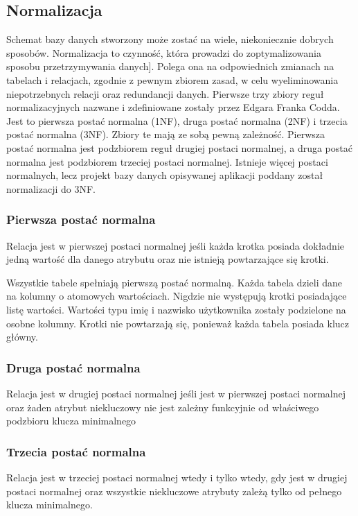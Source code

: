 \subsection{Normalizacja}
Schemat bazy danych stworzony może zostać na wiele, niekoniecznie dobrych sposobów. Normalizacja to czynność, która prowadzi do zoptymalizowania sposobu przetrzymywania danych]. Polega ona na odpowiednich zmianach na tabelach i relacjach, zgodnie z pewnym zbiorem zasad, w celu wyeliminowania niepotrzebnych relacji oraz redundancji danych. Pierwsze trzy zbiory reguł normalizacyjnych nazwane i zdefiniowane zostały przez Edgara Franka Codda. Jest to pierwsza postać normalna (1NF), druga postać normalna (2NF) i trzecia postać normalna (3NF). Zbiory te mają ze sobą pewną zależność. Pierwsza postać normalna jest podzbiorem reguł drugiej postaci normalnej, a druga postać normalna jest podzbiorem trzeciej postaci normalnej. Istnieje więcej postaci normalnych, lecz projekt bazy danych opisywanej aplikacji poddany został normalizacji do 3NF. \cite{db}

\subsubsection{Pierwsza postać normalna}
	\begin{definition}
 		Relacja jest w pierwszej postaci normalnej jeśli każda krotka posiada dokładnie jedną wartość dla danego atrybutu oraz nie istnieją powtarzające się krotki.
	\end{definition}
Wszystkie tabele spełniają pierwszą postać normalną. Każda tabela dzieli dane na kolumny o atomowych wartościach. Nigdzie nie występują krotki posiadające listę wartości. Wartości typu imię i nazwisko użytkownika zostały podzielone na osobne kolumny. Krotki nie powtarzają się, ponieważ każda tabela posiada klucz główny.
	
\subsubsection{Druga  postać normalna}
	\begin{definition}
Relacja jest w drugiej postaci normalnej jeśli jest w pierwszej postaci normalnej oraz żaden atrybut niekluczowy nie jest zależny funkcyjnie od właściwego podzbioru
klucza minimalnego
	\end{definition}

\subsubsection{Trzecia  postać normalna}
	\begin{definition}
Relacja jest w trzeciej postaci normalnej wtedy i tylko wtedy, gdy jest w drugiej postaci normalnej oraz
wszystkie niekluczowe atrybuty zależą tylko od pełnego klucza
minimalnego.
	\end{definition}

